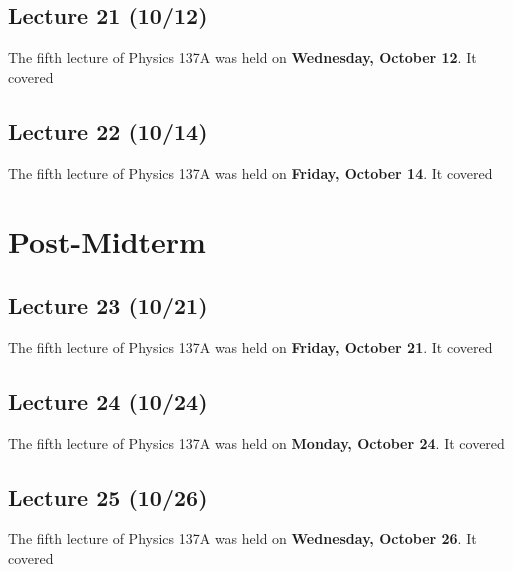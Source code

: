 \documentclass{book}
\theoremstyle{plain}
\begin{document}
      \chapter{Lecture 21 (10/12)}
        The fifth lecture of Physics 137A was held on \textbf{Wednesday, October 12}. It covered
        
      \chapter{Lecture 22 (10/14)}
        The fifth lecture of Physics 137A was held on \textbf{Friday, October 14}. It covered
        
      
    \part{Post-Midterm}
      \chapter{Lecture 23 (10/21)}
        The fifth lecture of Physics 137A was held on \textbf{Friday, October 21}. It covered
        
      \chapter{Lecture 24 (10/24)}
        The fifth lecture of Physics 137A was held on \textbf{Monday, October 24}. It covered
        
      \chapter{Lecture 25 (10/26)}
        The fifth lecture of Physics 137A was held on \textbf{Wednesday, October 26}. It covered
        
\end{document}
